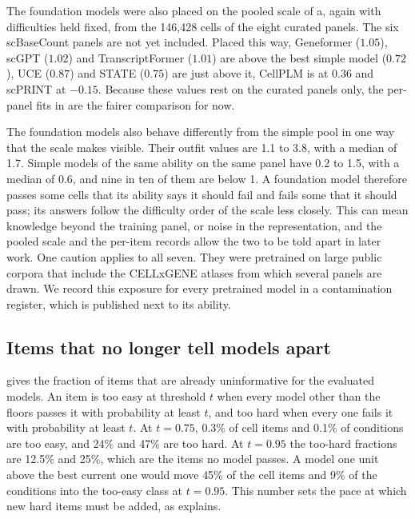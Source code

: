 \documentclass[]{style}
\begin{document}
The foundation models were also placed on the pooled scale of a, again
with difficulties held fixed, from the 146,428 cells of the eight curated panels. The six
scBaseCount panels are not yet included. Placed this way, Geneformer ($1.05$), scGPT
($1.02$) and TranscriptFormer ($1.01$) are above the best simple model ($0.72$), UCE
($0.87$) and STATE ($0.75$) are just above it, CellPLM is at $0.36$ and scPRINT at
$-0.15$. Because these values rest on the curated panels only, the per-panel fits in
 are the fairer comparison for now.

The foundation models also behave differently from the simple pool in one way that the
scale makes visible. Their outfit values are 1.1 to 3.8, with a median of 1.7. Simple
models of the same ability on the same panel have 0.2 to 1.5, with a median of 0.6, and
nine in ten of them are below 1. A foundation model therefore passes some cells that its ability says it
should fail and fails some that it should pass; its answers follow the difficulty order of
the scale less closely. This can mean knowledge beyond the training panel, or noise in the
representation, and the pooled scale and the per-item records allow the two to be told
apart in later work. One caution applies to all seven. They were pretrained on large
public corpora that include the CELLxGENE atlases from which several panels are drawn. We
record this exposure for every pretrained model in a contamination register, which is
published next to its ability.

\subsection{Items that no longer tell models apart}
\label{sec:retire}

 gives the fraction of items that are already uninformative for the
evaluated models. An item is too easy at threshold $t$ when every model other than the
floors passes it with probability at least $t$, and too hard when every one fails it with
probability at least $t$. At $t=0.75$, 0.3\% of cell items and 0.1\% of conditions are too
easy, and 24\% and 47\% are too hard. At $t=0.95$ the too-hard fractions are 12.5\% and
25\%, which are the items no model passes. A model one unit above the best current one
would move 45\% of the cell items and 9\% of the conditions into the too-easy class at
$t=0.95$. This number sets the pace at which new hard items must be added, as
 explains.
\end{document}
